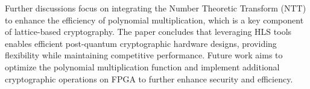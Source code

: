 Further discussions focus on integrating the Number Theoretic Transform (NTT) to enhance the efficiency of polynomial multiplication, which is a key component of lattice-based cryptography. The paper concludes that leveraging HLS tools enables efficient post-quantum cryptographic hardware designs, providing flexibility while maintaining competitive performance. Future work aims to optimize the polynomial multiplication function and implement additional cryptographic operations on FPGA to further enhance security and efficiency.


\newpage
\newpage



